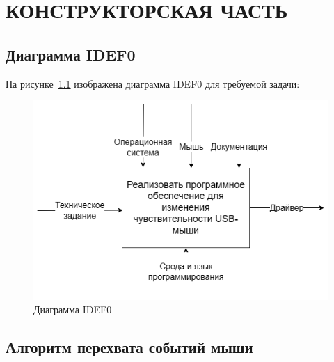 \chapter{КОНСТРУКТОРСКАЯ ЧАСТЬ}

\section{Диаграмма IDEF0}

На рисунке~\ref{fig:idef0} изображена диаграмма IDEF0 для требуемой задачи:

\begin{figure}[H]
	\centering
	\includegraphics[width=0.9\linewidth]{inc/idef0.png}
	\caption{Диаграмма IDEF0}
	\label{fig:idef0}
\end{figure}

\section{Алгоритм перехвата событий мыши}

